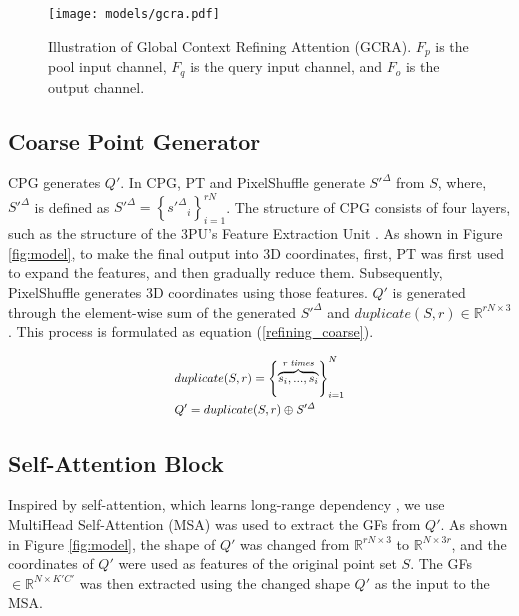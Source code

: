 \documentclass{article}
\begin{document}
\begin{figure}[htb!]
  \centering
\texttt{[image: models/gcra.pdf]}
\caption{Illustration of Global Context Refining Attention (GCRA). $F_p$ is the pool input channel, $F_q$ is the query input channel, and $F_o$ is the output channel.}
\label{fig:clf}
\end{figure}

\subsection{Coarse Point Generator}
\label{sec:coarse_point_generator}
\quad CPG generates $Q'$. In CPG, PT \cite{zhao2021point} and PixelShuffle \cite{shi2016real,qiu2021pu} generate $S'^{\Delta}$ from $S$, where, $S'^{\Delta}$ is defined as $\mathit{S'^{\Delta}} = \left\{\mathit{s'^{\Delta}}_{i} \right\}_{i = 1}^{rN}$. The structure of CPG consists of four layers, such as the structure of the 3PU's Feature Extraction Unit \cite{yifan2019patch}. As shown in Figure \ref{fig:model}, to make the final output into 3D coordinates, first, PT was first used to expand the features, and then gradually reduce them. Subsequently, PixelShuffle generates 3D coordinates using those features. $Q'$ is generated through the element-wise sum of the generated $S'^{\Delta}$ and $duplicate(S,r)\in\mathbb{R}^{rN \times 3}$. This process is formulated as equation (\ref{refining_coarse}).

\begin{center}
\begin{equation}\label{refining_coarse}
\scalebox{0.87}{$\begin{aligned}
    &duplicate(S,r)=\left\{\overbrace{s_{i},...,s_{i}}^{\textit{r times}}\right\}_{i = 1}^{N} \\
    &Q' = duplicate(S,r) \oplus \mathit{S'^{\Delta}}
\end{aligned}$}
\end{equation}
\end{center}

\subsection{Self-Attention Block} 
\label{sec:MHSA} 
\quad Inspired by self-attention, which learns long-range dependency \cite{vaswani2017attention}, we use MultiHead Self-Attention (MSA) was used to extract the GFs from $Q'$. As shown in Figure \ref{fig:model}, the shape of $Q'$ was changed from $\mathbb{R}^{rN \times 3}$ to $\mathbb{R}^{N \times 3r}$, and the coordinates of $Q'$ were used as features of the original point set $S$. The GFs$\in \mathbb{R}^{N \times K'C'}$ was then extracted using the changed shape $Q'$ as the input to the MSA.
\end{document}
